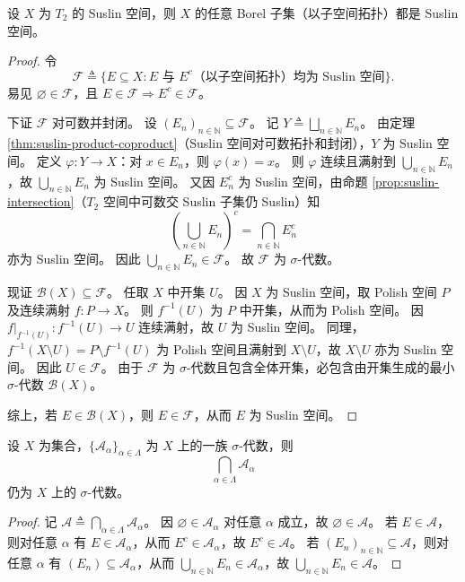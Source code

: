 \documentclass[lang=cn,a4paper,newtx,figureplace=section,tableplace=section]{elegantbook}
\begin{document}
\begin{theorem}\label{thm:borel-suslin}
  设 $X$ 为 $T_2$ 的 Suslin 空间，则 $X$ 的任意 Borel 子集（以子空间拓扑）都是 Suslin 空间。
\end{theorem}
\begin{proof}
  令
  \[
    \mathcal{F}\triangleq\{E\subseteq X: E\text{ 与 }E^c\text{（以子空间拓扑）均为 Suslin 空间}\}.
  \]
  易见 $\varnothing\in\mathcal{F}$，且 $E\in\mathcal{F}\Rightarrow E^c\in\mathcal{F}$。

  下证 $\mathcal{F}$ 对可数并封闭。
  设 $(E_n)_{n\in\mathbb{N}}\subseteq\mathcal{F}$。
  记 $Y\triangleq\bigsqcup_{n\in\mathbb{N}}E_n$。
  由定理 \ref{thm:suslin-product-coproduct}（Suslin 空间对可数拓扑和封闭），$Y$ 为 Suslin 空间。
  定义 $\varphi:Y\to X$：对 $x\in E_n$，则 $\varphi(x)=x$。
  则 $\varphi$ 连续且满射到 $\bigcup_{n\in\mathbb{N}}E_n$，故 $\bigcup_{n\in\mathbb{N}}E_n$ 为 Suslin 空间。
  又因 $E_n^c$ 为 Suslin 空间，由命题 \ref{prop:suslin-intersection}（$T_2$ 空间中可数交 Suslin 子集仍 Suslin）知
  \[
    \left(\bigcup_{n\in\mathbb{N}}E_n\right)^c=\bigcap_{n\in\mathbb{N}}E_n^c
  \]
  亦为 Suslin 空间。
  因此 $\bigcup_{n\in\mathbb{N}}E_n\in\mathcal{F}$。
  故 $\mathcal{F}$ 为 $\sigma$-代数。

  现证 $\mathcal{B}(X)\subseteq\mathcal{F}$。
  任取 $X$ 中开集 $U$。
  因 $X$ 为 Suslin 空间，取 Polish 空间 $P$ 及连续满射 $f:P\to X$。
  则 $f^{-1}(U)$ 为 $P$ 中开集，从而为 Polish 空间。
  因 $f\vert_{f^{-1}(U)}:f^{-1}(U)\to U$ 连续满射，故 $U$ 为 Suslin 空间。
  同理，$f^{-1}(X\setminus U)=P\setminus f^{-1}(U)$ 为 Polish 空间且满射到 $X\setminus U$，故 $X\setminus U$ 亦为 Suslin 空间。
  因此 $U\in\mathcal{F}$。
  由于 $\mathcal{F}$ 为 $\sigma$-代数且包含全体开集，必包含由开集生成的最小 $\sigma$-代数 $\mathcal{B}(X)$。

  综上，若 $E\in\mathcal{B}(X)$，则 $E\in\mathcal{F}$，从而 $E$ 为 Suslin 空间。

 \end{proof}

\begin{proposition}
  设 $X$ 为集合，$\{\mathcal{A}_\alpha\}_{\alpha\in\Lambda}$ 为 $X$ 上的一族 $\sigma$-代数，则
  \[
    \bigcap_{\alpha\in\Lambda}\mathcal{A}_\alpha
  \]
  仍为 $X$ 上的 $\sigma$-代数。
\end{proposition}

\begin{proof}
  记 $\mathcal{A}\triangleq\bigcap_{\alpha\in\Lambda}\mathcal{A}_\alpha$。
  因 $\varnothing\in\mathcal{A}_\alpha$ 对任意 $\alpha$ 成立，故 $\varnothing\in\mathcal{A}$。
  若 $E\in\mathcal{A}$，则对任意 $\alpha$ 有 $E\in\mathcal{A}_\alpha$，从而 $E^c\in\mathcal{A}_\alpha$，故 $E^c\in\mathcal{A}$。
  若 $(E_n)_{n\in\mathbb{N}}\subseteq\mathcal{A}$，则对任意 $\alpha$ 有 $(E_n)\subseteq\mathcal{A}_\alpha$，从而 $\bigcup_{n\in\mathbb{N}}E_n\in\mathcal{A}_\alpha$，故 $\bigcup_{n\in\mathbb{N}}E_n\in\mathcal{A}$。
\end{proof}
\end{document}
